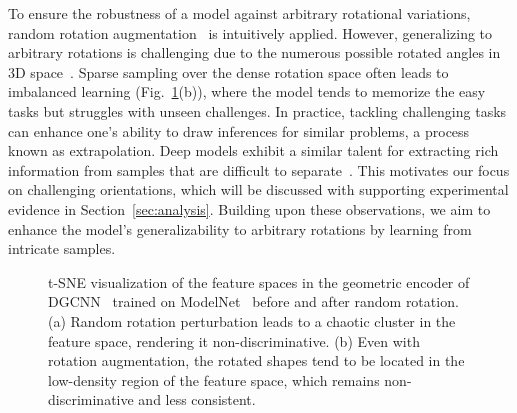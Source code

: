 To ensure the robustness of a model against arbitrary rotational variations, random rotation augmentation~\cite{qi2017pointnet,wang2019dynamic} is intuitively applied. However, generalizing to arbitrary rotations is challenging due to the numerous possible rotated angles in 3D space~\cite{zhao2019rotation}. Sparse sampling over the dense rotation space often leads to imbalanced learning (Fig.~\ref{fig:teaser}(b)), where the model tends to memorize the easy tasks but struggles with unseen challenges. In practice, tackling challenging tasks can enhance one's ability to draw inferences for similar problems, a process known as extrapolation. Deep models exhibit a similar talent for extracting rich information from samples that are difficult to separate~\cite{schroff2015facenet}. This motivates our focus on challenging orientations, which will be discussed with supporting experimental evidence in Section~\ref{sec:analysis}. Building upon these observations, we aim to enhance the model's generalizability to arbitrary rotations by learning from intricate samples.

\begin{figure}[t]
    \centering
    \vspace{-2mm}
    \caption{t-SNE visualization of the feature spaces in the geometric encoder of DGCNN~\cite{wang2019dynamic} trained on ModelNet~\cite{wu20153d} before and after random rotation.
(a) Random rotation perturbation leads to a chaotic cluster in the feature space, rendering it non-discriminative.
(b) Even with rotation augmentation, the rotated shapes tend to be located in the low-density region of the feature space, which remains non-discriminative and less consistent. }
\vspace{-5mm}
    \label{fig:teaser}
\end{figure}


